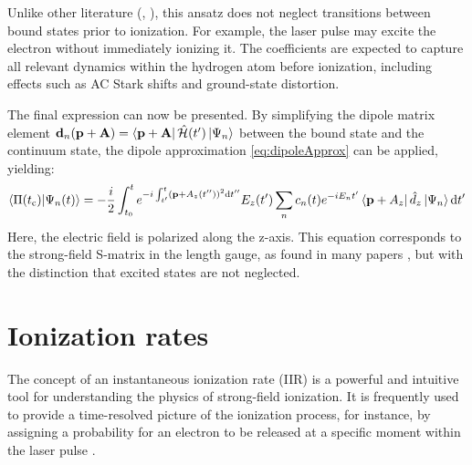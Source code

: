 Unlike other literature (\cite{Theory_NPS}, \cite{Ivanov20012005}), this ansatz does not neglect transitions between bound states prior to ionization.
For example, the laser pulse may excite the electron without immediately ionizing it.
The coefficients are expected to capture all relevant dynamics within the hydrogen atom before ionization, including effects such as AC Stark shifts and ground-state distortion.

The final expression can now be presented.
By simplifying the dipole matrix element $\mathbf{d}_n(\mathbf{p}+\mathbf{A}) = \bra{\mathbf{p}+\mathbf{A}}\hat{\mathcal{H}}(t')\ket{\Psi_n}$ between the bound state and the continuum state, the dipole approximation \eqref{eq:dipoleApprox} can be applied, yielding:
\begin{equation*}
    \braket{\Pi(t_{\mathrm{c}})|\Psi_n(t)} = -\frac{i}{2}\int_{t_0}^{t} e^{-i \int_{t'}^{t} (\mathbf{p} + A_z(t''))^2 \mathrm{d} t''}E_z(t')\sum_{n}c_n(t)e^{-iE_nt'}\bra{\mathbf{p}+A_z}\hat{d}_z\ket{\Psi_n} \mathrm{d} t'       \label{eq:smatrix}
\end{equation*}
Here, the electric field is polarized along the z-axis.
This equation corresponds to the strong-field S-matrix in the length gauge, as found in many papers \cite{Theory_NPS}, but with the distinction that excited states are not neglected.




\section{Ionization rates}



The concept of an instantaneous ionization rate (IIR) is a powerful and intuitive tool for understanding the physics of strong-field ionization. It is frequently used to provide a time-resolved picture of the ionization process, for instance, by assigning a probability for an electron to be released at a specific moment within the laser pulse \cite{Ivanov2018}.

